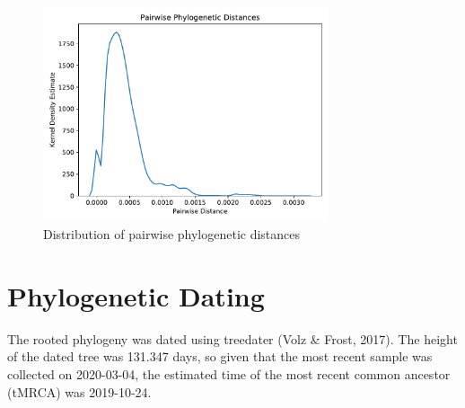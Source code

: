 \documentclass{article}
\begin{document}
\begin{figure}[h]
\centering
\includegraphics[width=0.75\textwidth,keepaspectratio]{./figs/pairwise_distances_tree.pdf}
\caption{Distribution of pairwise phylogenetic distances}
\end{figure}

\section{Phylogenetic Dating}
The rooted phylogeny was dated using treedater (Volz \& Frost, 2017).
The height of the dated tree was 131.347 days,
so given that the most recent sample was collected on 2020-03-04,
the estimated time of the most recent common ancestor (tMRCA) was 2019-10-24.
\end{document}
